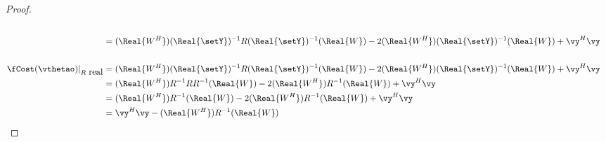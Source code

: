 \begin{proof}
\begin{align*}
   \\&=    (\Real{W^H})(\Real{\setY})^{-1} R (\Real{\setY})^{-1}(\Real{W})     - 2(\Real{W^H})(\Real{\setY})^{-1}(\Real{W})      + \vy^H\vy
\\
\\
   \fCost(\vthetao)|_{R\mbox{ real}}
     &=    (\Real{W^H})(\Real{\setY})^{-1} R (\Real{\setY})^{-1}(\Real{W}) - 2(\Real{W^H})(\Real{\setY})^{-1}(\Real{W}) + \vy^H\vy
   \\&=    (\Real{W^H})R^{-1} R R^{-1}(\Real{W}) - 2(\Real{W^H})R^{-1}(\Real{W}) + \vy^H\vy
   \\&=    (\Real{W^H}) R^{-1}(\Real{W}) - 2(\Real{W^H})R^{-1}(\Real{W}) + \vy^H\vy
   \\&=    \vy^H\vy - (\Real{W^H})R^{-1}(\Real{W})
\end{align*}
\end{proof}


